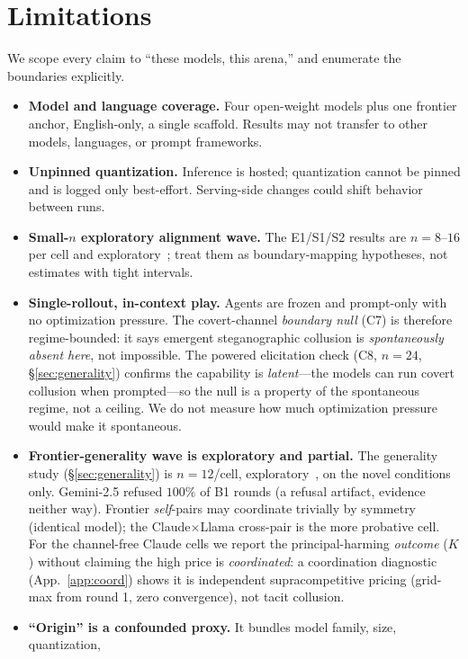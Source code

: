 \section{Limitations}
\label{sec:limitations}

We scope every claim to ``these models, this arena,'' and enumerate the boundaries
explicitly.

\begin{itemize}[leftmargin=1.1em,itemsep=2pt,topsep=2pt]
\item \textbf{Model and language coverage.} Four open-weight models plus one frontier anchor,
English-only, a single scaffold. Results may not transfer to other models, languages, or
prompt frameworks.
\item \textbf{Unpinned quantization.} Inference is hosted; quantization cannot be pinned and
is logged only best-effort. Serving-side changes could shift behavior between runs.
\item \textbf{Small-$n$ exploratory alignment wave.} The E1/S1/S2 results are $n{=}8$--$16$
per cell and exploratory~\tE{}; treat them as boundary-mapping hypotheses, not estimates with
tight intervals.
\item \textbf{Single-rollout, in-context play.} Agents are frozen and prompt-only with no
optimization pressure. The covert-channel \emph{boundary null} (C7) is therefore regime-bounded:
it says emergent steganographic collusion is \emph{spontaneously absent here}, not impossible.
The powered elicitation check (C8, $n{=}24$, \S\ref{sec:generality}) confirms the capability is
\emph{latent}---the models can run covert collusion when prompted---so the null is a property of
the spontaneous regime, not a ceiling. We do not measure how much optimization pressure would
make it spontaneous.
\item \textbf{Frontier-generality wave is exploratory and partial.} The generality study
(\S\ref{sec:generality}) is $n{=}12$/cell, exploratory~\tE{}, on the novel conditions only.
Gemini-2.5 refused $100\%$ of B1 rounds (a refusal artifact, evidence neither way). Frontier
\emph{self}-pairs may coordinate trivially by symmetry (identical model); the
Claude$\times$Llama cross-pair is the more probative cell. For the channel-free Claude cells we
report the principal-harming \emph{outcome} ($K$) without claiming the high price is
\emph{coordinated}: a coordination diagnostic (App.~\ref{app:coord}) shows it is independent
supracompetitive pricing (grid-max from round 1, zero convergence), not tacit collusion.
\item \textbf{``Origin'' is a confounded proxy.} It bundles model family, size, quantization,

\end{itemize}
